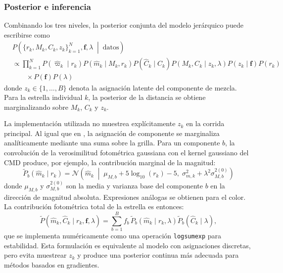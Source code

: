 \documentclass[stu, 12pt, letterpaper, donotrepeattitle, floatsintext, natbib]{apa7_ula}
\begin{document}
\subsubsection{Posterior e inferencia}
Combinando los tres niveles, la posterior conjunta del modelo
jerárquico puede escribirse como
\begin{equation}
\begin{aligned}
    &P\!\left(\{r_k, M_k, C_k, z_k\}_{k=1}^{N},
    \mathbf{f}, \lambda
    \;\middle|\; \text{datos}\right) \\
    &\propto
    \prod_{k=1}^{N}
    P(\hat{\varpi}_k \mid r_k)
    P(\hat{m}_k \mid M_k, r_k)
    P(\hat{C}_k \mid C_k)
    P(M_k, C_k \mid z_k, \lambda)
    P(z_k \mid \mathbf{f})
    P(r_k) \\
    &\qquad \times
    P(\mathbf{f})
    P(\lambda)
\end{aligned}
    \label{eq:semiadapt_post}
\end{equation}
 donde $z_k \in \{1, \ldots, B\}$ denota la asignación latente del
componente de mezcla. Para la estrella individual $k$, la posterior de
la distancia se obtiene marginalizando sobre $M_k$, $C_k$ y $z_k$.

La implementación utilizada no muestrea explícitamente $z_k$ en la
corrida principal. Al igual que en \citet{Leistedt_2017}, la asignación
de componente se marginaliza analíticamente mediante una suma sobre la
grilla. Para un componente $b$, la convolución de la verosimilitud
fotométrica gaussiana con el kernel gaussiano del CMD produce, por
ejemplo, la contribución marginal de la magnitud:
\begin{equation}
    \tilde{P}_b(\hat{m}_k \mid r_k) = \mathcal{N}\!\left(
    \hat{m}_k \;\middle|\; \mu_{M,b} + 5\log_{10}(r_k) - 5, \;
    \sigma_{m,k}^2 + \lambda^2\sigma_{M,b}^{2(0)}\right)
\end{equation}
donde $\mu_{M,b}$ y $\sigma_{M,b}^{2(0)}$ son la media y varianza base
del componente $b$ en la dirección de magnitud absoluta. Expresiones
análogas se obtienen para el color. La contribución fotométrica total
de la estrella es entonces:
\begin{equation}
    \tilde{P}(\hat{m}_k,\hat{C}_k \mid r_k,\mathbf{f},\lambda)
    = \sum_{b=1}^{B} f_b\,
    \tilde{P}_b(\hat{m}_k \mid r_k,\lambda)
    \tilde{P}_b(\hat{C}_k \mid \lambda),
    \label{eq:cmd_marginal_lik}
\end{equation}
que se implementa numéricamente como una operación \texttt{logsumexp}
para estabilidad. Esta formulación es equivalente al modelo con
asignaciones discretas, pero evita muestrear $z_k$ y produce una
posterior continua más adecuada para métodos basados en gradientes.
\end{document}
